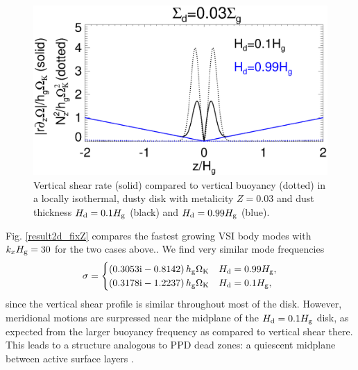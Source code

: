 \begin{figure}
  \includegraphics[width=\linewidth]{figures/compare_vshear_Nz2_fixZ} 
  \caption{Vertical shear rate (solid) compared to vertical buoyancy
    (dotted) in a locally isothermal, dusty disk 
    with metalicity $Z=0.03$ and dust thickness $H_\mathrm{d}=0.1H_\mathrm{g}$
    (black) and $H_\mathrm{d}=0.99H_\mathrm{g}$ (blue). 
    \label{compare_vshear_fixZ}
    }
\end{figure}

Fig. \ref{result2d_fixZ} compares the fastest growing VSI body modes  
with $k_xH_\mathrm{g}=30$ for the two cases above..   
We find very similar mode 
frequencies 
\begin{align*}
  \sigma = \begin{cases}
    \left(0.3053\mathrm{i} - 0.8142\right)h_\mathrm{g}\Omega_{\rm K} & H_\mathrm{d}=0.99H_\mathrm{g}, \\
    \left(0.3178\mathrm{i} - 1.2237\right)h_\mathrm{g}\Omega_{\rm K} & H_\mathrm{d}=0.1H_\mathrm{g},
  \end{cases}
\end{align*}
since the vertical shear profile is similar throughout most of the
disk. However, meridional motions are surpressed near the midplane of
the $H_\mathrm{d}=0.1H_\mathrm{g}$ disk, as expected from the larger buoyancy frequency
as compared to vertical shear there. This leads to a structure
analogous to PPD dead zones: a quiescent midplane between active
surface layers \citep{gammie96}.  



